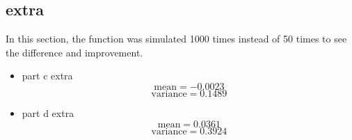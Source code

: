 \subsection{extra}
In this section, the function was simulated 1000 times instead of 50 times to see the difference and improvement.
\begin{itemize}
    \item part c extra
    $$
    \text{mean} = -0.0023
    $$
    $$
    \text{variance} = 0.1489
    $$
    \item part d extra
    $$
    \text{mean} = 0.0361
    $$
    $$
    \text{variance} = 0.3924
    $$
\end{itemize}